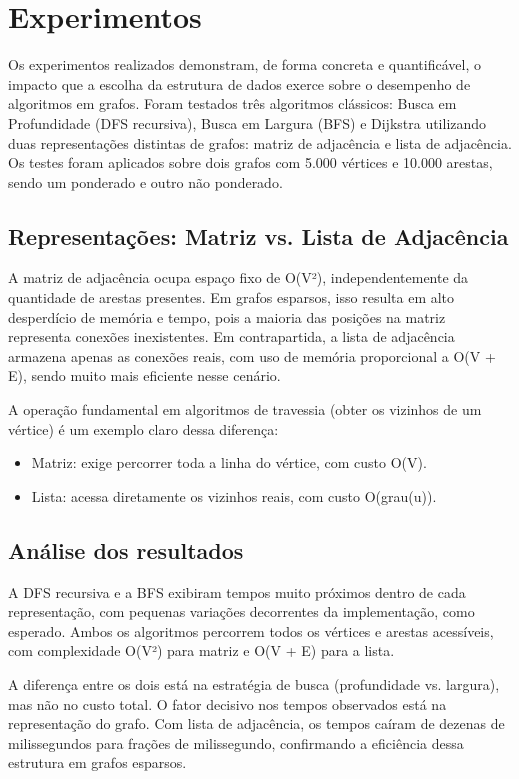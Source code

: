 \documentclass{sbc2023}%
\begin{document}
\section{Experimentos}

Os experimentos realizados demonstram, de forma concreta e quantificável, o impacto que a escolha da estrutura de dados exerce sobre o desempenho de algoritmos em grafos. Foram testados três algoritmos clássicos: Busca em Profundidade (DFS recursiva), Busca em Largura (BFS) e Dijkstra utilizando duas representações distintas de grafos: matriz de adjacência e lista de adjacência. Os testes foram aplicados sobre dois grafos com 5.000 vértices e 10.000 arestas, sendo um ponderado e outro não ponderado.


\subsection{Representações: Matriz vs. Lista de Adjacência}

A matriz de adjacência ocupa espaço fixo de O(V²), independentemente da quantidade de arestas presentes. Em grafos esparsos, isso resulta em alto desperdício de memória e tempo, pois a maioria das posições na matriz representa conexões inexistentes. Em contrapartida, a lista de adjacência armazena apenas as conexões reais, com uso de memória proporcional a O(V + E), sendo muito mais eficiente nesse cenário.

A operação fundamental em algoritmos de travessia (obter os vizinhos de um vértice) é um exemplo claro dessa diferença:

\begin{itemize}
  \item Matriz: exige percorrer toda a linha do vértice, com custo O(V).
  \item Lista: acessa diretamente os vizinhos reais, com custo O(grau(u)).
\end{itemize}

\subsection{Análise dos resultados}
A DFS recursiva e a BFS exibiram tempos muito próximos dentro de cada representação, com pequenas variações decorrentes da implementação, como esperado. Ambos os algoritmos percorrem todos os vértices e arestas acessíveis, com complexidade O(V²) para matriz e O(V + E) para a lista.

A diferença entre os dois está na estratégia de busca (profundidade vs. largura), mas não no custo total. O fator decisivo nos tempos observados está na representação do grafo. Com lista de adjacência, os tempos caíram de dezenas de milissegundos para frações de milissegundo, confirmando a eficiência dessa estrutura em grafos esparsos.
\end{document}
